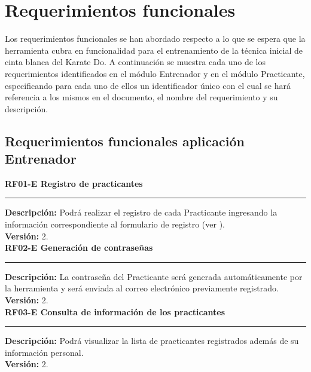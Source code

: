 \section{Requerimientos funcionales}

Los requerimientos funcionales se han abordado respecto a lo que se espera que la herramienta cubra en funcionalidad para el entrenamiento de la técnica inicial de cinta blanca del Karate Do. A continuación se muestra cada uno de los requerimientos identificados en el módulo Entrenador y en el módulo Practicante, especificando para cada uno de ellos un identificador único con el cual se hará referencia a los mismos en el documento, el nombre del requerimiento y su descripción. \\

\subsection{Requerimientos funcionales aplicación Entrenador}

\textbf{\textcolor[rgb]{0, 0, 0.545098}{RF01-E \hspace{2cm} Registro de practicantes}}\\
\rule[3mm]{17cm}{0.1mm}
\label{rf:RF01-E}
\textbf{Descripción: } Podrá realizar el registro de cada Practicante ingresando la información correspondiente al formulario de registro (ver  ). \\
\textbf{Versión: } 2. \\

\textbf{\textcolor[rgb]{0, 0, 0.545098}{RF02-E \hspace{2cm} Generación de contraseñas}}\\
\rule[3mm]{17cm}{0.1mm}
\label{rf:RF02-E}
\textbf{Descripción: } La contraseña del Practicante será generada automáticamente por la herramienta y será enviada al correo electrónico previamente registrado. \\
\textbf{Versión: } 2. \\

\textbf{\textcolor[rgb]{0, 0, 0.545098}{RF03-E \hspace{2cm} Consulta de información de los practicantes}}\\
\rule[3mm]{17cm}{0.1mm}
\label{rf:RF03-E}
\textbf{Descripción: } Podrá visualizar la lista de practicantes registrados además de su información personal. \\
\textbf{Versión: } 2. \\

